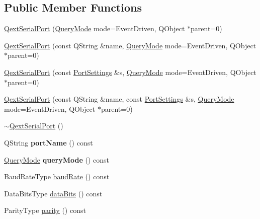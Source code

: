 \subsection*{Public Member Functions}
\begin{DoxyCompactItemize}
\item 
\hyperlink{classQextSerialPort_af36bd1a07fc25c3874cbba5a4a1d6b02}{Qext\+Serial\+Port} (\hyperlink{classQextSerialPort_a6002128d7351ea9a958d6a6d1fc6b9bd}{Query\+Mode} mode=Event\+Driven, Q\+Object $\ast$parent=0)
\item 
\hyperlink{classQextSerialPort_ab8e7dd61c9b064b55d4c609ae1f2afcb}{Qext\+Serial\+Port} (const Q\+String \&name, \hyperlink{classQextSerialPort_a6002128d7351ea9a958d6a6d1fc6b9bd}{Query\+Mode} mode=Event\+Driven, Q\+Object $\ast$parent=0)
\item 
\hyperlink{classQextSerialPort_a7ddaffdbbb507477fd4f4224dcbe21a4}{Qext\+Serial\+Port} (const \hyperlink{structPortSettings}{Port\+Settings} \&s, \hyperlink{classQextSerialPort_a6002128d7351ea9a958d6a6d1fc6b9bd}{Query\+Mode} mode=Event\+Driven, Q\+Object $\ast$parent=0)
\item 
\hyperlink{classQextSerialPort_aff4f0246637293ba6751a5993a645b20}{Qext\+Serial\+Port} (const Q\+String \&name, const \hyperlink{structPortSettings}{Port\+Settings} \&s, \hyperlink{classQextSerialPort_a6002128d7351ea9a958d6a6d1fc6b9bd}{Query\+Mode} mode=Event\+Driven, Q\+Object $\ast$parent=0)
\item 
\hyperlink{classQextSerialPort_a0712978a092762f69f308df7372e3f7a}{$\sim$\+Qext\+Serial\+Port} ()
\item 
\mbox{\label{classQextSerialPort_aec8816b3ee7863891dd3542282d78b70}} 
Q\+String {\bfseries port\+Name} () const
\item 
\mbox{\label{classQextSerialPort_a397b0f5b630292f7609acd7a2b787bee}} 
\hyperlink{classQextSerialPort_a6002128d7351ea9a958d6a6d1fc6b9bd}{Query\+Mode} {\bfseries query\+Mode} () const
\item 
Baud\+Rate\+Type \hyperlink{classQextSerialPort_a6ff8552e67d0de8036c8827bee8298c5}{baud\+Rate} () const
\item 
Data\+Bits\+Type \hyperlink{classQextSerialPort_a55dc431a89ac054c1a0e4269a8fcc62e}{data\+Bits} () const
\item 
Parity\+Type \hyperlink{classQextSerialPort_a76f94dbf2ebb40bcd2b784c38974075f}{parity} () const
\item 

\end{DoxyCompactItemize}
